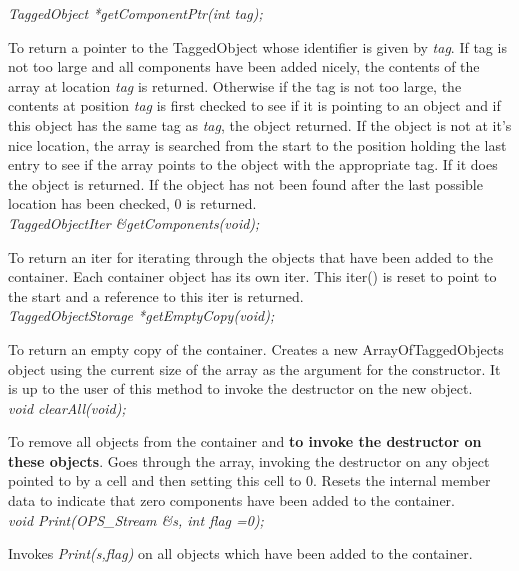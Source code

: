 {\em TaggedObject *getComponentPtr(int tag);}

To return a pointer to the TaggedObject whose identifier is given by
{\em tag}. If tag is not too large
and all components have been added nicely, the contents of the array
at location {\em tag} is returned. Otherwise if the tag is not too
large, the contents at position {\em tag} is first checked to see if it
is pointing to an object and if this object has the same tag as {\em
tag}, the object returned. If 
the object is not at it's nice location, the array is searched from
the start to the position holding the last entry to see if the array
points to the object with the appropriate tag. If it does the object
is returned. If the object has not been found after the last possible
location has been checked, $0$ is returned. \\


{\em TaggedObjectIter \&getComponents(void);}

To return an iter for iterating through the objects that have been
added to the container. Each container object has its own iter. This
iter() is reset to point to the start and a reference to this iter is
returned.\\ 

{\em TaggedObjectStorage *getEmptyCopy(void);}

To return an empty copy of the container. Creates a new
ArrayOfTaggedObjects object using the current size of the array as the
argument for the constructor. It is up to the user of this method to
invoke the destructor on the new object. \\

{\em void clearAll(void);}

To remove all objects from the container and {\bf to invoke the
destructor on these objects}. Goes through the array, invoking the
destructor on any object pointed to by a cell and then setting this
cell to $0$. Resets the internal member data to indicate that zero
components have been added to the container.\\

{\em void Print(OPS_Stream \&s, int flag =0);}

Invokes {\em Print(s,flag)} on all objects which have been added to
the container. 






